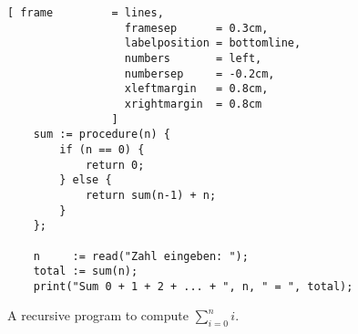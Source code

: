 \begin{figure}[!ht]
  \centering
\begin{Verbatim}[ frame         = lines, 
                  framesep      = 0.3cm, 
                  labelposition = bottomline,
                  numbers       = left,
                  numbersep     = -0.2cm,
                  xleftmargin   = 0.8cm,
                  xrightmargin  = 0.8cm
                ]
    sum := procedure(n) {
        if (n == 0) { 
            return 0;
        } else {
            return sum(n-1) + n;
        }
    };
    
    n     := read("Zahl eingeben: "); 
    total := sum(n);
    print("Sum 0 + 1 + 2 + ... + ", n, " = ", total);
\end{Verbatim} 
\vspace*{-0.3cm}
  \caption{A recursive program to compute $\sum\limits_{i=0}^ni$.}
  \label{fig:sum-recursive.stlx}
\end{figure} 

